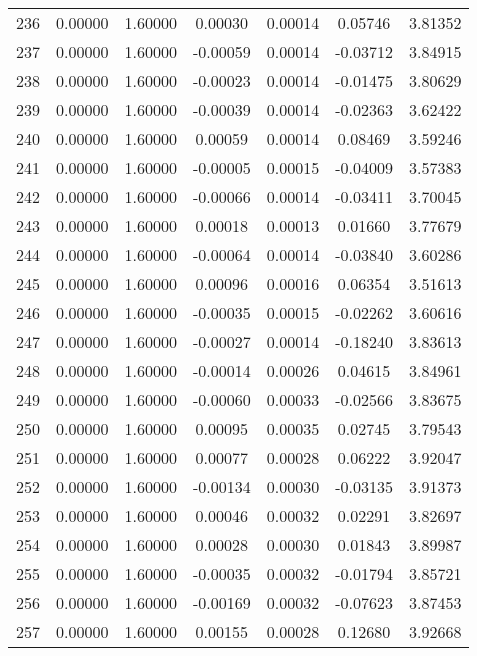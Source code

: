 \begin{longtable}{c c c c c c c}
236 &  0.00000 &      1.60000 &  0.00030 &   0.00014 &   0.05746 &   3.81352 \\
237 &  0.00000 &      1.60000 & -0.00059 &   0.00014 &  -0.03712 &   3.84915 \\
238 &  0.00000 &      1.60000 & -0.00023 &   0.00014 &  -0.01475 &   3.80629 \\
239 &  0.00000 &      1.60000 & -0.00039 &   0.00014 &  -0.02363 &   3.62422 \\
240 &  0.00000 &      1.60000 &  0.00059 &   0.00014 &   0.08469 &   3.59246 \\
241 &  0.00000 &      1.60000 & -0.00005 &   0.00015 &  -0.04009 &   3.57383 \\
242 &  0.00000 &      1.60000 & -0.00066 &   0.00014 &  -0.03411 &   3.70045 \\
243 &  0.00000 &      1.60000 &  0.00018 &   0.00013 &   0.01660 &   3.77679 \\
244 &  0.00000 &      1.60000 & -0.00064 &   0.00014 &  -0.03840 &   3.60286 \\
245 &  0.00000 &      1.60000 &  0.00096 &   0.00016 &   0.06354 &   3.51613 \\
246 &  0.00000 &      1.60000 & -0.00035 &   0.00015 &  -0.02262 &   3.60616 \\
247 &  0.00000 &      1.60000 & -0.00027 &   0.00014 &  -0.18240 &   3.83613 \\
248 &  0.00000 &      1.60000 & -0.00014 &   0.00026 &   0.04615 &   3.84961 \\
249 &  0.00000 &      1.60000 & -0.00060 &   0.00033 &  -0.02566 &   3.83675 \\
250 &  0.00000 &      1.60000 &  0.00095 &   0.00035 &   0.02745 &   3.79543 \\
251 &  0.00000 &      1.60000 &  0.00077 &   0.00028 &   0.06222 &   3.92047 \\
252 &  0.00000 &      1.60000 & -0.00134 &   0.00030 &  -0.03135 &   3.91373 \\
253 &  0.00000 &      1.60000 &  0.00046 &   0.00032 &   0.02291 &   3.82697 \\
254 &  0.00000 &      1.60000 &  0.00028 &   0.00030 &   0.01843 &   3.89987 \\
255 &  0.00000 &      1.60000 & -0.00035 &   0.00032 &  -0.01794 &   3.85721 \\
256 &  0.00000 &      1.60000 & -0.00169 &   0.00032 &  -0.07623 &   3.87453 \\
257 &  0.00000 &      1.60000 &  0.00155 &   0.00028 &   0.12680 &   3.92668 \\

\end{longtable}
